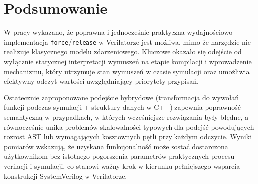 \documentclass[shortabstract, inz]{iithesis}
\begin{document}
\section{Podsumowanie}

W pracy wykazano, że poprawna i jednocześnie praktyczna wydajnościowo implementacja \texttt{force}/\texttt{release} w Verilatorze jest możliwa, mimo że narzędzie nie realizuje klasycznego modelu zdarzeniowego. Kluczowe okazało się odejście od wyłącznie statycznej interpretacji wymuszeń na etapie kompilacji i wprowadzenie mechanizmu, który utrzymuje stan wymuszeń w czasie symulacji oraz umożliwia efektywny odczyt wartości uwzględniający priorytety przypisań.

Ostatecznie zaproponowane podejście hybrydowe (transformacja do wywołań funkcji podczas symulacji + struktury danych w C++) zapewnia poprawność semantyczną w przypadkach, w których wcześniejsze rozwiązania były błędne, a równocześnie unika problemów skalowalności typowych dla podejść powodujących rozrost AST lub wymagających kosztownych pętli przy każdym odczycie. Wyniki pomiarów wskazują, że uzyskana funkcjonalność może zostać dostarczona użytkownikom bez istotnego pogorszenia parametrów praktycznych procesu verilacji i symulacji, co stanowi ważny krok w kierunku pełniejszego wsparcia konstrukcji SystemVerilog w Verilatorze.



\printbibliography
\end{document}
